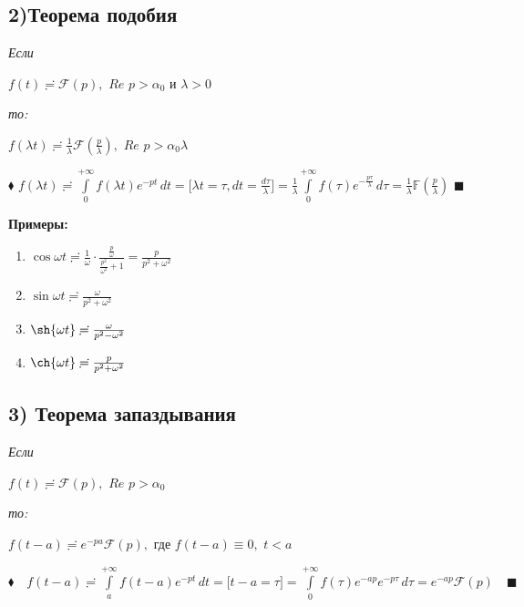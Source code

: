 \documentclass[a4paper, 12pt]{report}
\begin{document}
\subsection*{2)Теорема подобия }
\par
\textsl{Если}
\begin{center}
$f(t) \risingdotseq \mathcal{F}(p), $ $Re$ $p > \alpha_0$ и $\lambda > 0$
\end{center}
\par
\textsl{то:}
\begin{center}
\par 
$f(\lambda t) \risingdotseq \frac{1}{\lambda} \mathcal{F}(\frac{p}{\lambda}), $ $Re$ $p > \alpha_0 \lambda$
\end{center}
\par\bigskip
$\blacklozenge$ \quad $f(\lambda t) \risingdotseq \int\limits_{0}^{+ \infty} f(\lambda t) e^{-pt}\, dt = \biggl[\lambda t = \tau, dt = \frac{d\tau}{\lambda} \biggr] = \frac{1}{\lambda} \int\limits_{0}^{+\infty} f(\tau) e^{-\frac{p\tau}{\lambda}}\, d\tau = \frac{1}{\lambda} \mathbb{F}(\frac{p}{\lambda})$ \quad $\blacksquare$
\par\bigskip
\textbf{Примеры:}
\begin{enumerate}
    \item $\cos{\omega t} \risingdotseq \frac{1}{\omega} \cdot \frac{\frac{p}{\omega}}{\frac{p^2}{\omega^2} + 1} = \frac{p}{p^2 + \omega^2}$
    \item $\sin{\omega t} \risingdotseq \frac{\omega}{p^2 + \omega^2}$
    \item $\sh{\omega t} \risingdotseq \frac{\omega}{p^2 - \omega^2}$
    \item $\ch{\omega t} \risingdotseq \frac{p}{p^2 + \omega^2}$
\end{enumerate}

\par\bigskip
\subsection*{3) Теорема запаздывания }
\par
\textsl{Если}
\begin{center}
$f(t) \risingdotseq \mathcal{F}(p), $ $Re$ $p > \alpha_0$
\end{center}
\par
\textsl{то:}
\begin{center}
\par 
$f(t - a) \risingdotseq e^{-pa} \mathcal{F}(p), $  где $f(t-a) \equiv 0, $ $t < a$ 
\end{center}
\par\bigskip
$\blacklozenge \quad f(t - a) \risingdotseq \int\limits_{a}^{+ \infty} f(t - a) e^{-pt}\, dt = \biggl[ t - a = \tau \biggr] = \int\limits_{0}^{+ \infty} f(\tau) e^{-ap} e^{-p\tau}\, d\tau = e^{-ap}\mathcal{F}(p) \quad \blacksquare$
\par\bigskip
\end{document}
